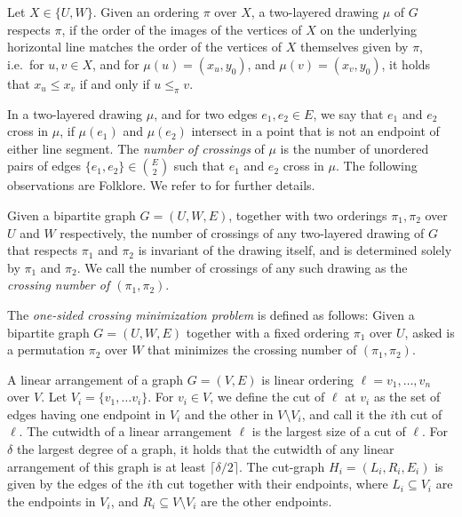\documentclass[a4paper,UKenglish,cleveref, autoref, thm-restate]{lipics-v2021}
\newcommand{\layerone}{\ensuremath{U}}
\newcommand{\layertwo}{\ensuremath{W}}
\begin{document}
Let $X\in \{\layerone, \layertwo\}$. Given an ordering $\pi$ over $X$, a two-layered drawing $\mu$ of $G$ respects $\pi$, if the order of the images of the vertices of $X$  on the underlying horizontal line matches the order of the vertices of $X$ themselves given by $\pi$, i.e.\ for $u,v \in X$, and for $\mu(u) = (x_u, y_0)$, and $\mu(v) = (x_v, y_0)$, it holds that $x_u \leq x_v$ if and only if $u\leq_{\pi} v$.

In a two-layered drawing $\mu$, and for two edges $e_1, e_2 \in E$, we say that $e_1$ and $e_2$ cross in $\mu$, if $\mu(e_1)$ and $\mu({e_2})$ intersect in a point that is not an endpoint of either line segment. The \emph{number of crossings} of $\mu$ is the number of unordered pairs of edges $\{e_1, e_2\}\in \binom{E}{2}$ such that $e_1$ and $e_2$ cross in $\mu$.
The following observations are Folklore. We refer to \cite{DBLP:journals/algorithmica/DujmovicW04} for further details.
\begin{lemma}
    Given a bipartite graph $G=(\layerone,\layertwo, E)$, together with two orderings $\pi_1, \pi_2$ over $\layerone$ and $\layertwo$ respectively, the number of crossings of any two-layered drawing  of $G$ that respects $\pi_1$ and $\pi_2$ is invariant of the drawing itself, and is determined solely by $\pi_1$ and $\pi_2$.
    We call the number of crossings of any such drawing as the \emph{crossing number of $(\pi_1, \pi_2)$}.
\end{lemma}

\begin{definition}
    The \emph{one-sided crossing minimization problem} is defined as follows: Given a bipartite graph $G = (\layerone,\layertwo,E)$ together with a fixed ordering $\pi_1$ over $\layerone$, asked is a permutation $\pi_2$ over $\layertwo$ that minimizes the crossing number of $(\pi_1, \pi_2)$.
\end{definition}

A linear arrangement of a graph $G=(V,E)$ is linear ordering $\ell = v_1, \dots, v_n$ over $V$. Let $V_i = \{v_1,\dots v_i\}$. For $v_i \in V$, we define the cut of $\ell$ at $v_i$ as the set of edges having one endpoint in $V_i$ and the other in $V\setminus V_i$, and call it the $i$th cut of $\ell$.
The cutwidth of a linear arrangement $\ell$ is the largest size of a cut of $\ell$. For $\delta$ the largest degree of a graph, it holds that the cutwidth of any linear arrangement of this graph is at least $\lceil\delta/2\rceil$.
The cut-graph $H_i = (L_i,R_i, E_i)$ is given by the edges of the $i$th cut together with their endpoints, where $L_i\subseteq V_i$ are the endpoints in $V_i$, and $R_i \subseteq V\setminus V_i$ are the other endpoints.
\end{document}
